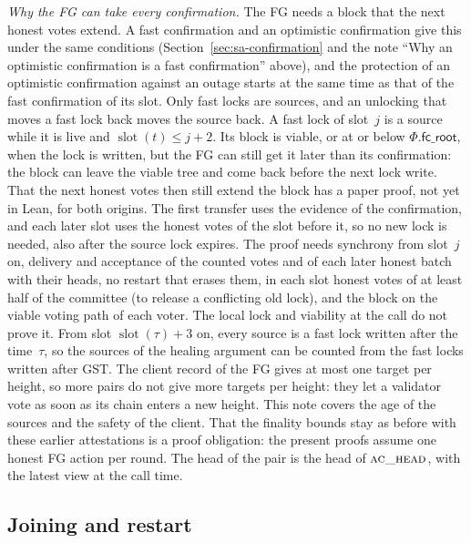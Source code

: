 \documentclass{article}
\newcommand{\slot}{\operatorname{slot}}
\newcommand{\Fr}{\Phi}
\newcommand{\fcroot}{\mathsf{fc\_root}}
\begin{document}
\emph{Why the FG can take every confirmation.}  The FG needs a block that
the next honest votes extend.  A fast confirmation and an optimistic
confirmation give this under the same conditions
(Section~\ref{sec:sa-confirmation} and the note ``Why an optimistic
confirmation is a fast confirmation'' above), and the protection of an optimistic
confirmation against an outage starts at the same time as that of the
fast confirmation of its slot.  Only fast locks are sources, and an
unlocking that moves a fast lock back moves the source back.  A fast lock
of slot~$j$ is a source while it is live and $\slot(t)\leq j+2$.  Its
block is viable, or at or below $\Fr.\fcroot$, when the lock is written,
but the FG can still get it
later than its confirmation: the block can leave the viable tree and come
back before the next lock write.  That the next honest votes then still
extend the block has a paper proof, not yet in Lean, for both origins.
The first transfer uses the evidence of the confirmation, and each later
slot uses the honest votes of the slot before it, so no new lock is
needed, also after the source lock expires.  The proof needs synchrony
from slot~$j$ on, delivery and acceptance of the counted votes and of
each later honest batch with their heads, no restart that erases them,
in each slot honest votes of at least half of the committee (to release
a conflicting old lock), and the block on the viable voting path of each
voter.  The local lock and viability at the call do not prove it.  From slot $\slot(\tau)+3$ on, every source is a fast lock
written after the time~$\tau$, so the sources of the healing argument can
be counted from the fast locks written after GST.  The client record of the FG gives at most
one target per height, so more pairs do not give more targets per height:
they let a validator vote as soon as its chain enters a new height.  This
note covers the age of the sources and the safety of the client.  That the finality
bounds stay as before with these earlier attestations is a proof
obligation: the present proofs assume one honest FG action per round.  The head of the pair is the
head of $\Call{ac\_head}{}$, with the latest view at the call time.

\subsection{Joining and restart}\label{sec:sa-joining}
\end{document}
